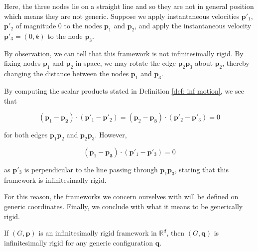 \vspace{-2mm}
\begin{flushleft}
Here, the three nodes lie on a straight line and so they are not in general position which means they are not generic. Suppose we apply instantaneous velocities $\mathbf{p}'_1$, $\mathbf{p}'_2$ of magnitude 0 to the nodes $\mathbf{p}_1$ and $\mathbf{p}_2$, and apply the instantaneous velocity $\mathbf{p}'_3 = (0,k)$ to the node $\mathbf{p}_3$.
\end{flushleft}

\begin{flushleft}
By observation, we can tell that this framework is not infinitesimally rigid. By fixing nodes $\mathbf{p}_1$ and $\mathbf{p}_2$ in space, we may rotate the edge $\mathbf{p}_2\mathbf{p}_3$ about $\mathbf{p}_2$, thereby changing the distance between the nodes $\mathbf{p}_1$ and $\mathbf{p}_3$. 
\end{flushleft}

\begin{flushleft}
By computing the scalar products stated in Definition \ref{def: inf motion}, we see that 
\end{flushleft}
\vspace{-0.5mm}
\[
(\mathbf{p}_1 - \mathbf{p_2}) \cdot (\mathbf{p}'_1 - \mathbf{p}'_2) = (\mathbf{p}_2 - \mathbf{p_3}) \cdot (\mathbf{p}'_2 - \mathbf{p}'_3) = 0
\]

\begin{flushleft}
for both edges $\mathbf{p}_1\mathbf{p}_2$ and $\mathbf{p}_2\mathbf{p}_3$. However, 
\end{flushleft}
\vspace{-0.5mm}
\[
(\mathbf{p}_1 - \mathbf{p_3}) \cdot (\mathbf{p}'_1 - \mathbf{p}'_3) = 0
\]

\begin{flushleft}
as $\mathbf{p}'_3$ is perpendicular to the line passing through $\mathbf{p}_1\mathbf{p}_3$, stating that this framework is infinitesimally rigid. 
\end{flushleft}

\begin{flushleft}
For this reason, the frameworks we concern ourselves with will be defined on generic coordinates. Finally, we conclude with what it means to be generically rigid.    
\end{flushleft}

\begin{theorem}
\label{def: generic rigid}
If $(G,\mathbf{p})$ is an infinitesimally rigid framework in $\mathbb{R}^d$, then $(G,\mathbf{q})$ is infinitesimally rigid for any generic configuration $\mathbf{q}$.
\end{theorem}

